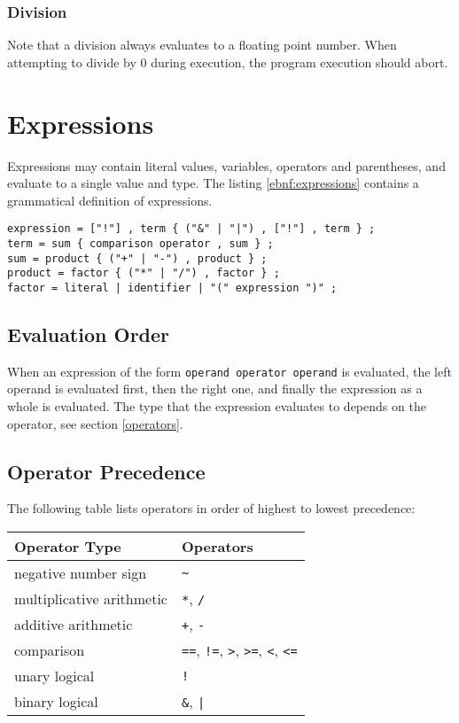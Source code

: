 \documentclass[a4paper,appendixprefix]{scrreprt}
\begin{document}
\subsection{Division}
Note that a division always evaluates to a floating point number. When attempting to divide by 0 during execution, the program execution should abort.

\chapter{Expressions}\label{expressions}
Expressions may contain literal values, variables, operators and parentheses, and evaluate to a single value and type. The listing \ref{ebnf:expressions} contains a grammatical definition of expressions.

\begin{lstlisting}[label={ebnf:expressions},caption={Expressions Grammar}]
expression = ["!"] , term { ("&" | "|") , ["!"] , term } ;
term = sum { comparison operator , sum } ;
sum = product { ("+" | "-") , product } ;
product = factor { ("*" | "/") , factor } ;
factor = literal | identifier | "(" expression ")" ;
\end{lstlisting}

\section{Evaluation Order}
When an expression of the form \texttt{operand operator operand} is evaluated, the left operand is evaluated first, then the right one, and finally the expression as a whole is evaluated. The type that the expression evaluates to depends on the operator, see section \ref{operators}.

\section{Operator Precedence}
The following table lists operators in order of highest to lowest precedence:

\begin{center}
  \begin{tabularx}{\textwidth}{|X|X|}
    \hline
    \textbf{Operator Type} & \textbf{Operators} \\ \hline
    negative number sign & \verb|~| \\ \hline
    multiplicative arithmetic & \verb|*|, \verb|/| \\ \hline
    additive arithmetic & \verb|+|, \verb|-| \\ \hline
    comparison & \verb|==|, \verb|!=|, \verb|>|, \verb|>=|, \verb|<|, \verb|<=| \\ \hline
    unary logical & \verb|!| \\ \hline
    binary logical & \verb|&|, \texttt{|} \\ \hline
  \end{tabularx}
\end{center}
\end{document}
